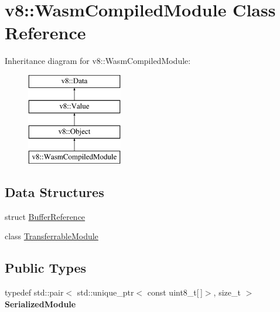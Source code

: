 \hypertarget{classv8_1_1WasmCompiledModule}{}\section{v8\+:\+:Wasm\+Compiled\+Module Class Reference}
\label{classv8_1_1WasmCompiledModule}
Inheritance diagram for v8\+:\+:Wasm\+Compiled\+Module\+:\begin{figure}[H]
\begin{center}
\leavevmode
\includegraphics[height=4.000000cm]{classv8_1_1WasmCompiledModule}
\end{center}
\end{figure}
\subsection*{Data Structures}
\begin{DoxyCompactItemize}
\item 
struct \mbox{\hyperlink{structv8_1_1WasmCompiledModule_1_1BufferReference}{Buffer\+Reference}}
\item 
class \mbox{\hyperlink{classv8_1_1WasmCompiledModule_1_1TransferrableModule}{Transferrable\+Module}}
\end{DoxyCompactItemize}
\subsection*{Public Types}
\begin{DoxyCompactItemize}
\item 
\mbox{\label{classv8_1_1WasmCompiledModule_af5ba87d6a6d78c06360c753001417f57}} 
typedef std\+::pair$<$ std\+::unique\+\_\+ptr$<$ const uint8\+\_\+t\mbox{[}$\,$\mbox{]}$>$, size\+\_\+t $>$ {\bfseries Serialized\+Module}
\end{DoxyCompactItemize}
